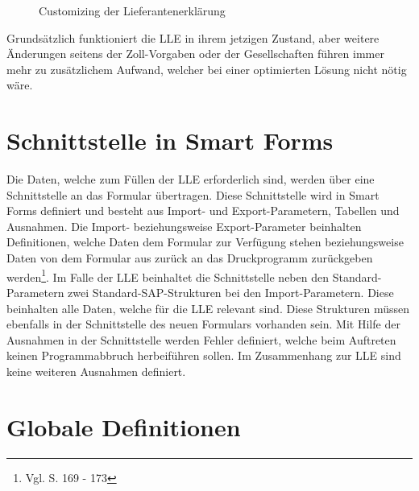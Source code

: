 		
	\begin{figure}[ht]
		\centering
		\caption{Customizing der Lieferantenerklärung }
		\label{fig4}
	\end{figure}

	Grundsätzlich funktioniert die \ac{LLE} in ihrem jetzigen Zustand, aber weitere Änderungen seitens der Zoll-Vorgaben oder der Gesellschaften führen immer mehr zu zusätzlichem Aufwand, welcher bei einer optimierten Lösung nicht nötig wäre. 

	\FloatBarrier
	
	\section{Schnittstelle in Smart Forms}
	
	Die Daten, welche zum Füllen der \ac{LLE} erforderlich sind, werden über eine Schnittstelle an das Formular übertragen. Diese Schnittstelle wird in Smart Forms definiert und besteht aus Import- und Export-Parametern, Tabellen und Ausnahmen. Die Import- beziehungsweise Export-Parameter beinhalten Definitionen, welche Daten dem Formular zur Verfügung stehen beziehungsweise Daten von dem Formular aus zurück an das Druckprogramm zurückgeben werden\footnote{Vgl. \cite{Hertleif.2003} S. 169 - 173}. Im Falle der \ac{LLE} beinhaltet die Schnittstelle neben den Standard-Parametern zwei Standard-SAP-Strukturen bei den Import-Parametern. Diese beinhalten alle Daten, welche für die \ac{LLE} relevant sind. Diese Strukturen müssen ebenfalls in der Schnittstelle des neuen Formulars vorhanden sein. Mit Hilfe der Ausnahmen in der Schnittstelle werden Fehler definiert, welche beim Auftreten keinen Programmabbruch herbeiführen sollen. Im Zusammenhang zur \ac{LLE} sind keine weiteren Ausnahmen definiert.    
	\section{Globale Definitionen}
	

